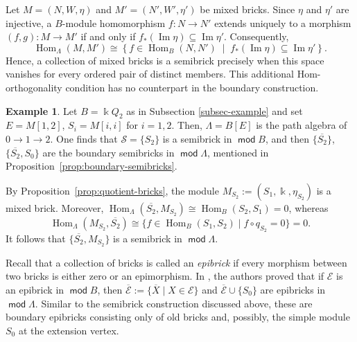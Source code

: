 \documentclass[a4,12pt]{amsart}
\numberwithin{equation}{section} %
\def\Hom{\operatorname{Hom}} %
\def\mod{\operatorname{\mathsf{mod}}}
\theoremstyle{definition} %
\newtheorem{example}[theorem]{Example} %
\begin{document}
Let $M=(N,W,\eta)$ and $M'=(N',W',\eta')$ be mixed bricks. Since $\eta$ and $\eta'$ are injective, a $B$-module homomorphism
$f\colon N\to N'$ extends uniquely to a morphism $(f,g)\colon M\to M'$ if and only if $f_*(\operatorname{Im}\eta) \subseteq \operatorname{Im}\eta'$. Consequently,
\[
\Hom_\Lambda(M,M')
\cong
\left\{
f\in\Hom_B(N,N')
\;\middle|\;
f_*(\operatorname{Im}\eta)
\subseteq
\operatorname{Im}\eta'
\right\}.
\]
Hence, a collection of mixed bricks is a semibrick precisely when this space vanishes for every ordered pair of distinct members. This
additional Hom-orthogonality condition has no counterpart in the
boundary construction. 

\begin{example}
Let $B=\Bbbk Q_2$ as in Subsection \ref{subsec-example} and set $E=M[1,2]$, $S_i=M[i,i]$ for $i=1,2$. Then, $\Lambda=B[E]$ is the path algebra of $0\rightarrow1\rightarrow2$. One finds that $\mathcal{S}=\{S_2\}$ is a semibrick in $\mod B$, and then $\{\overline{S_2}\}$, $\{\overline{S_2},S_0\}$ are the boundary
semibricks in $\mod \Lambda$, mentioned in Proposition~\ref{prop:boundary-semibricks}.

By Proposition~\ref{prop:quotient-bricks}, the module $M_{S_2}:=(S_1,\Bbbk,\eta_{S_2})$ is a mixed brick. Moreover, $\Hom_\Lambda(\overline{S_2},M_{S_2}) \cong \Hom_B(S_2,S_1) = 0$, whereas
\[
\Hom_\Lambda(M_{S_2},\overline{S_2})
\cong
\{f\in\Hom_B(S_1,S_2)\mid f \circ q_{S_2}=0\}
=
0.
\]
It follows that $\{\overline{S_2},M_{S_2}\}$ is a semibrick in $\mod \Lambda$. 
\end{example}

Recall that a collection of bricks is called an \emph{epibrick} if every morphism between two bricks is either zero or an epimorphism. In \cite[Theorem~3.5]{LiGaoEpibricks}, the authors proved that if $\mathcal{E}$ is an epibrick in $\mod B$, then $\overline{\mathcal{E}} :=\{\overline X\mid X\in\mathcal{E}\}$ and $\overline{\mathcal{E}}\cup\{S_0\}$ are epibricks in $\mod \Lambda$. Similar to the semibrick construction discussed above, these are boundary epibricks consisting only of old bricks and, possibly, the simple module $S_0$ at the extension vertex.
\end{document}
